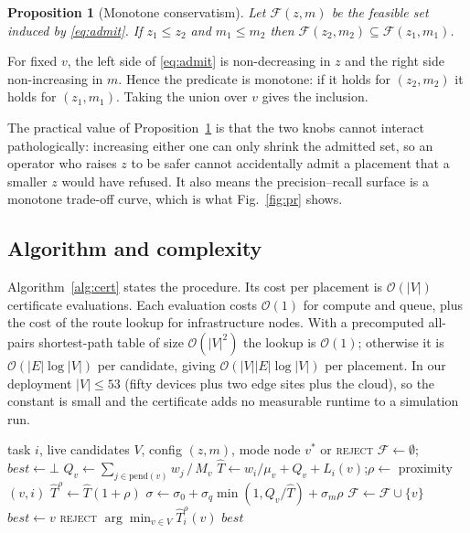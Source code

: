 \documentclass[journal,10pt]{IEEEtran}
\newtheorem{proposition}{Proposition}
\newcommand{\T}{\ensuremath{\hat{T}}}
\newcommand{\sig}{\ensuremath{\sigma}}
\newcommand{\bigO}{\ensuremath{\mathcal{O}}}
\begin{document}
\begin{proposition}[Monotone conservatism]
\label{prop:monotone}
Let $\mathcal{F}(z,m)$ be the feasible set induced by \eqref{eq:admit}. If
$z_1\le z_2$ and $m_1\le m_2$ then
$\mathcal{F}(z_2,m_2)\subseteq\mathcal{F}(z_1,m_1)$.
\end{proposition}

\begin{IEEEproof}
For fixed $v$, the left side of \eqref{eq:admit} is non-decreasing in $z$ and
the right side non-increasing in $m$. Hence the predicate is monotone: if it
holds for $(z_2,m_2)$ it holds for $(z_1,m_1)$. Taking the union over $v$ gives
the inclusion.
\end{IEEEproof}

The practical value of Proposition~\ref{prop:monotone} is that the two knobs
cannot interact pathologically: increasing either one can only shrink the
admitted set, so an operator who raises $z$ to be safer cannot accidentally
admit a placement that a smaller $z$ would have refused. It also means the
precision--recall surface is a monotone trade-off curve, which is what
Fig.~\ref{fig:pr} shows.

\subsection{Algorithm and complexity}
Algorithm~\ref{alg:cert} states the procedure. Its cost per placement is
$\bigO(|V|)$ certificate evaluations. Each evaluation costs $\bigO(1)$ for
compute and queue, plus the cost of the route lookup for infrastructure nodes.
With a precomputed all-pairs shortest-path table of size $\bigO(|V|^2)$ the
lookup is $\bigO(1)$; otherwise it is $\bigO(|E|\log|V|)$ per candidate, giving
$\bigO(|V||E|\log|V|)$ per placement. In our deployment $|V|\le 53$ (fifty
devices plus two edge sites plus the cloud), so the constant is small and the
certificate adds no measurable runtime to a simulation run.

\begin{algorithm}[t]
\caption{Feasibility-certified placement for one task}
\label{alg:cert}
\begin{algorithmic}[1]
\Require task $i$, live candidates $V$, config $(z,m)$, mode
\Ensure node $v^\ast$ or \textsc{reject}
\State $\mathcal{F}\gets\emptyset$;\quad $best\gets\bot$
  \State $Q_v\gets \sum_{j\in\mathrm{pend}(v)}w_j\,/\,M_v$
  \State $\T\gets w_i/\mu_v+Q_v+L_i(v)$;\quad $\rho\gets$ proximity$(v,i)$
  \State $\T^{\rho}\gets \T(1+\rho)$
  \State $\sig\gets \sig_0+\sig_q\min(1,Q_v/\T)+\sig_m\rho$
  \If{$\T^{\rho}(1+z\sig)\le(1-m)D_i$}
    \State $\mathcal{F}\gets\mathcal{F}\cup\{v\}$
    \If{$\T^{\rho}<\T^{\rho}(best)$} $best\gets v$ \EndIf
  \EndIf
\EndFor
{}
   \State \Return \textsc{reject}
  \Else \State \Return $\arg\min_{v\in V}\T^{\rho}_i(v)$ 
  \EndIf
\EndIf
\State \Return $best$
\end{algorithmic}
\end{algorithm}
\end{document}
